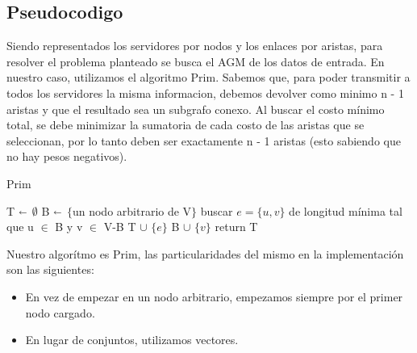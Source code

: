 \subsection{Pseudocodigo}

Siendo representados los servidores por nodos y los enlaces por aristas, para resolver el problema planteado se busca el AGM de los datos de entrada. En nuestro caso, utilizamos el algoritmo Prim.
Sabemos que, para poder transmitir a todos los servidores la misma informacion, debemos devolver como minimo n - 1 aristas y que el resultado sea un subgrafo conexo. Al buscar el costo mínimo total, se debe minimizar la sumatoria de cada costo de las aristas que se seleccionan, por lo tanto deben ser exactamente n - 1 aristas (esto sabiendo que no hay pesos negativos). 


\begin{algorithm}[H]
\caption{Prim}\label{ej2}
\begin{algorithmic}[1]
	\State T  $\shortleftarrow$ $\emptyset$
	\State B $\shortleftarrow$ $\{$un nodo arbitrario de V$\}$
		\State buscar $e=\{u,v\}$ de longitud mínima tal que u $\in$ B y v $\in$ V-B
		\State T $\cup$ $\{e\}$
		\State B $\cup$ $\{v\}$
	\EndWhile
	\State return T
\EndProcedure
\end{algorithmic}
\end{algorithm}


Nuestro algorítmo es Prim, las particularidades del mismo en la implementación son las siguientes:

\begin{itemize}
\item En vez de empezar en un nodo arbitrario, empezamos siempre por el primer nodo cargado.
\item En lugar de conjuntos, utilizamos vectores.
\end{itemize}

